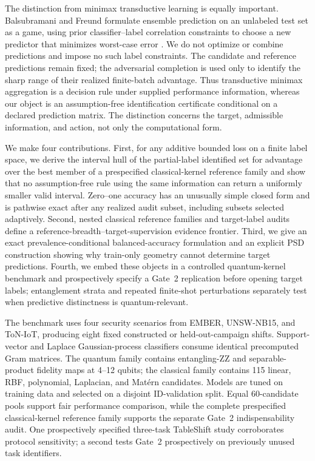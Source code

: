 \documentclass[referee,lineno,pdflatex,sn-nature]{sn-jnl}
\theoremstyle{thmstyleone}%
\theoremstyle{thmstyletwo}%
\theoremstyle{thmstylethree}%
\begin{document}
The distinction from minimax transductive learning is equally important. Balsubramani and Freund formulate ensemble prediction on an unlabeled test set as a game, using prior classifier--label correlation constraints to choose a new predictor that minimizes worst-case error \cite{balsubramani2015optimally}. We do not optimize or combine predictions and impose no such label constraints. The candidate and reference predictions remain fixed; the adversarial completion is used only to identify the sharp range of their realized finite-batch advantage. Thus transductive minimax aggregation is a decision rule under supplied performance information, whereas our object is an assumption-free identification certificate conditional on a declared prediction matrix. The distinction concerns the target, admissible information, and action, not only the computational form.

We make four contributions. First, for any additive bounded loss on a finite label space, we derive the interval hull of the partial-label identified set for advantage over the best member of a prespecified classical-kernel reference family and show that no assumption-free rule using the same information can return a uniformly smaller valid interval. Zero--one accuracy has an unusually simple closed form and is pathwise exact after any realized audit subset, including subsets selected adaptively. Second, nested classical reference families and target-label audits define a reference-breadth--target-supervision evidence frontier. Third, we give an exact prevalence-conditional balanced-accuracy formulation and an explicit PSD construction showing why train-only geometry cannot determine target predictions. Fourth, we embed these objects in a controlled quantum-kernel benchmark and prospectively specify a Gate~2 replication before opening target labels; entanglement strata and repeated finite-shot perturbations separately test when predictive distinctness is quantum-relevant.

The benchmark uses four security scenarios from EMBER, UNSW-NB15, and ToN-IoT, producing eight fixed constructed or held-out-campaign shifts. Support-vector and Laplace Gaussian-process classifiers consume identical precomputed Gram matrices. The quantum family contains entangling-ZZ and separable-product fidelity maps at 4--12 qubits; the classical family contains 115 linear, RBF, polynomial, Laplacian, and Mat\'ern candidates. Models are tuned on training data and selected on a disjoint ID-validation split. Equal 60-candidate pools support fair performance comparison, while the complete prespecified classical-kernel reference family supports the separate Gate~2 indispensability audit. One prospectively specified three-task TableShift study corroborates protocol sensitivity; a second tests Gate~2 prospectively on previously unused task identifiers.
\end{document}
